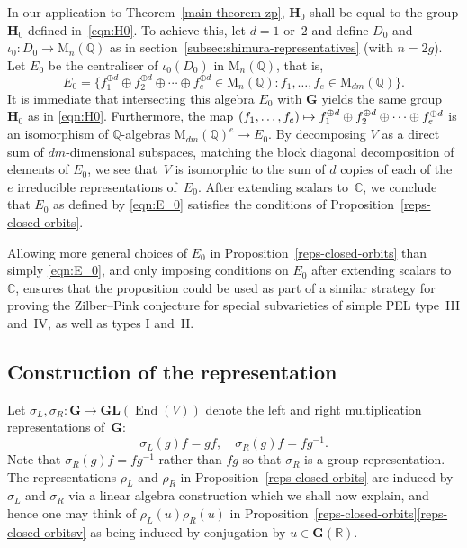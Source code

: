 \documentclass[11pt]{article}
\numberwithin{equation}{section}
\def\mto{\mathchoice{\longmapsto}{\mapsto}{\mapsto}{\mapsto}}
\newcommand{\bC}{\mathbb{C}}
\newcommand{\bQ}{\mathbb{Q}}
\newcommand{\bR}{\mathbb{R}}
\newcommand{\gG}{\mathbf{G}}
\newcommand{\gGL}{\mathbf{GL}}
\newcommand{\gH}{\mathbf{H}}
\newcommand{\rM}{\mathrm{M}}
\DeclareMathOperator{\End}{End}
\begin{document}
In our application to Theorem~\ref{main-theorem-zp}, $\gH_0$ shall be equal to the group $\gH_0$ defined in~\eqref{eqn:H0}.
To achieve this, let $d=1$ or~$2$ and define $D_0$ and $\iota_0 \colon D_0 \to \rM_n(\bQ)$ as in section~\ref{subsec:shimura-representatives} (with $n=2g$).
Let $E_0$ be the centraliser of $\iota_0(D_0)$ in $\rM_n(\bQ)$, that is,
\begin{equation} \label{eqn:E_0}
E_0 = \{ f_1^{\oplus d} \oplus f_2^{\oplus d} \oplus \dotsb \oplus f_e^{\oplus d} \in \rM_n(\bQ) :
f_1, \dotsc, f_e \in \rM_{dm}(\bQ) \}.
\end{equation}
It is immediate that intersecting this algebra $E_0$ with $\gG$ yields the same group $\gH_0$ as in \eqref{eqn:H0}.
Furthermore, the map $(f_1, \dotsc, f_e) \mto f_1^{\oplus d} \oplus f_2^{\oplus d} \oplus \dotsb \oplus f_e^{\oplus d}$ is an isomorphism of $\bQ$-algebras $\rM_{dm}(\bQ)^e \to E_0$.
By decomposing $V$ as a direct sum of $dm$-dimensional subspaces, matching the block diagonal decomposition of elements of $E_0$, we see that~$V$ is isomorphic to the sum of $d$ copies of each of the $e$ irreducible representations of~$E_0$.
After extending scalars to~$\bC$, we conclude that $E_0$ as defined by \eqref{eqn:E_0} satisfies the conditions of Proposition~\ref{reps-closed-orbits}.

Allowing more general choices of $E_0$ in Proposition~\ref{reps-closed-orbits} than simply \eqref{eqn:E_0}, and only imposing conditions on $E_0$ after extending scalars to~$\bC$, ensures that the proposition could be used as part of a similar strategy for proving the Zilber--Pink conjecture for special subvarieties of simple PEL type~III and~IV, as well as types I and~II.

\subsection{Construction of the representation}

Let $\sigma_L, \sigma_R \colon \gG \to \gGL(\End(V))$ denote the left and right multiplication representations of~$\gG$:
\begin{equation*}
\sigma_L(g)f = gf, \quad \sigma_R(g)f = fg^{-1}.
\end{equation*}
Note that $\sigma_R(g)f = fg^{-1}$ rather than $fg$ so that $\sigma_R$ is a group representation.
The representations $\rho_L$ and $\rho_R$ in Proposition~\ref{reps-closed-orbits} are induced by $\sigma_L$ and $\sigma_R$ via a linear algebra construction which we shall now explain, and hence one may think of $\rho_L(u)\rho_R(u)$ in Proposition~\ref{reps-closed-orbits}\eqref{reps-closed-orbitsv} as being induced by conjugation by $u \in \gG(\bR)$.
\end{document}
